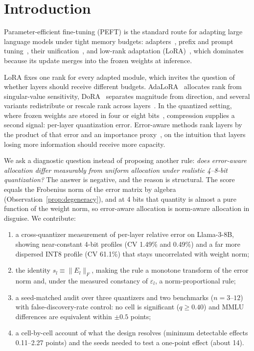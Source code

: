 \documentclass[preprint,12pt]{elsarticle}
\begin{document}
\section{Introduction}
\label{sec:intro}

Parameter-efficient fine-tuning (PEFT) is the standard route for adapting large language models under tight memory budgets: adapters~\citep{houlsby2019adapters}, prefix and prompt tuning~\citep{li2021prefix,lester2021prompt}, their unification~\citep{he2022unified}, and low-rank adaptation (LoRA)~\citep{hu2022lora}, which dominates because its update merges into the frozen weights at inference.

LoRA fixes one rank for every adapted module, which invites the question of whether layers should receive different budgets. AdaLoRA~\citep{zhang2023adalora} allocates rank from singular-value sensitivity, DoRA~\citep{liu2024dora} separates magnitude from direction, and several variants redistribute or rescale rank across layers~\citep{meng2024pissa,kalajdzievski2023rslora,kopiczko2024vera,ploner2026variablerank}. In the quantized setting, where frozen weights are stored in four or eight bits~\citep{dettmers2023qlora,dettmers2022llmint8}, compression supplies a second signal: per-layer quantization error. Error-aware methods rank layers by the product of that error and an importance proxy~\citep{kim2024ralora,lee2025rilq}, on the intuition that layers losing more information should receive more capacity.

We ask a diagnostic question instead of proposing another rule: \emph{does error-aware allocation differ measurably from uniform allocation under realistic 4--8-bit quantization?} The answer is negative, and the reason is structural. The score equals the Frobenius norm of the error matrix by algebra (Observation~\ref{prop:degeneracy}), and at 4 bits that quantity is almost a pure function of the weight norm, so error-aware allocation is norm-aware allocation in disguise. We contribute:
\begin{enumerate}
    \item a cross-quantizer measurement of per-layer relative error on Llama-3-8B, showing near-constant 4-bit profiles (CV 1.49\% and 0.49\%) and a far more dispersed INT8 profile (CV 61.1\%) that stays uncorrelated with weight norm;
    \item the identity $s_l \equiv \|E_l\|_F$, making the rule a monotone transform of the error norm and, under the measured constancy of $\varepsilon_l$, a norm-proportional rule;
    \item a seed-matched audit over three quantizers and two benchmarks ($n = 3$--$12$) with false-discovery-rate control: no cell is significant ($q \geq 0.40$) and MMLU differences are equivalent within $\pm 0.5$ points;
    \item a cell-by-cell account of what the design resolves (minimum detectable effects 0.11--2.27 points) and the seeds needed to test a one-point effect (about 14).
\end{enumerate}
\end{document}
